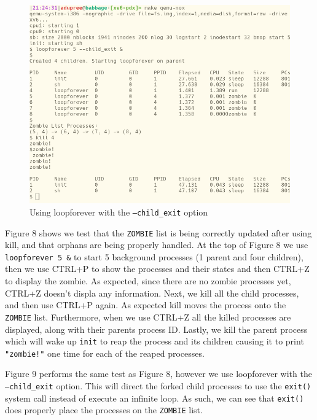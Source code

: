 \documentclass[11pt,letterpaper]{report}
\newcommand{\code}[1]{\colorbox{codegray}{\texttt{#1}}}
\begin{document}
{  \begin{figure}[h!]
	\centering
  \includegraphics[width=1\linewidth]{processdeath2.png}
	\caption[img]{Using loopforever with the \code{--child\_exit} option}
	\label{fig:P1compileP0-1}
  \end{figure}

  \pagebreak

  Figure 8 shows we test that the \code{ZOMBIE} list is being correctly updated after 
  using kill, and that orphans are being properly handled. At the top of Figure 8
  we use \code{loopforever 5 \&} to start 5 background processes (1 parent and four children), 
  then we use CTRL+P to show the processes and their states and then CTRL+Z to display the 
  zombie. As expected, since there are no zombie processes yet, CTRL+Z doesn't displa any 
  information. Next, we kill all the child processes, and then use CTRL+P again. As expected
  kill moves the process onto the \code{ZOMBIE} list. Furthermore, when we use CTRL+Z
  all the killed processes are displayed, along with their parents process ID. Lastly, 
  we kill the parent process which will wake up \code{init} to reap the process and its children
  causing it to print \code{"zombie!"} one time for each of the reaped processes. 

  Figure 9 performs the same test as Figure 8, however we use loopforever with the 
  \code{--child\_exit} option. This will direct the forked child processes to use the 
  \code{exit()} system call instead of execute an infinite loop. As such, we can see 
  that \code{exit()} does properly place the processes on the \code{ZOMBIE} list. 

\ifdefined \LF
} %
\fi
\end{document}
